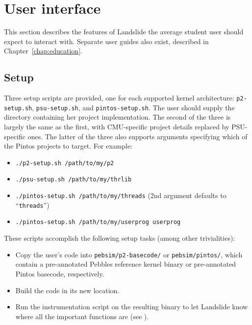 \section{User interface}

This section describes the features of Landslide the average student user should expect to interact with.
Separate user guides also exist, described in Chapter~\ref{chap:education}.


\subsection{Setup}
\label{sec:landslide-setup}

Three setup scripts are provided, one for each supported kernel architecture: {\tt p2-setup.sh}, {\tt psu-setup.sh}, and {\tt pintos-setup.sh}.
The user should supply the directory containing her project implementation.
The second of the three is largely the same as the first, with CMU-specific project details replaced by PSU-specific ones.
The latter of the three also supports arguments specifying which of the Pintos projects to target.
For example:
\begin{itemize}
	\item {\tt ./p2-setup.sh /path/to/my/p2}
	\item {\tt ./psu-setup.sh /path/to/my/thrlib}
	\item {\tt ./pintos-setup.sh /path/to/my/threads} (2nd argument defaults to ``{\tt threads}'')
	\item {\tt ./pintos-setup.sh /path/to/my/userprog userprog}
\end{itemize}

These scripts accomplish the following setup tasks (among other trivialities):
\begin{itemize}
	\item Copy the user's code into {\tt pebsim/p2-basecode/} or {\tt pebsim/pintos/},
		which contain a pre-annotated Pebbles reference kernel binary or pre-annotated Pintos basecode, respectively.
	\item Build the code in its new location.
	\item Run the instrumentation script on the resulting binary to let Landslide know where all the important functions are
		(see \sect{\ref{sec:landslide-glue}}).
\end{itemize}

